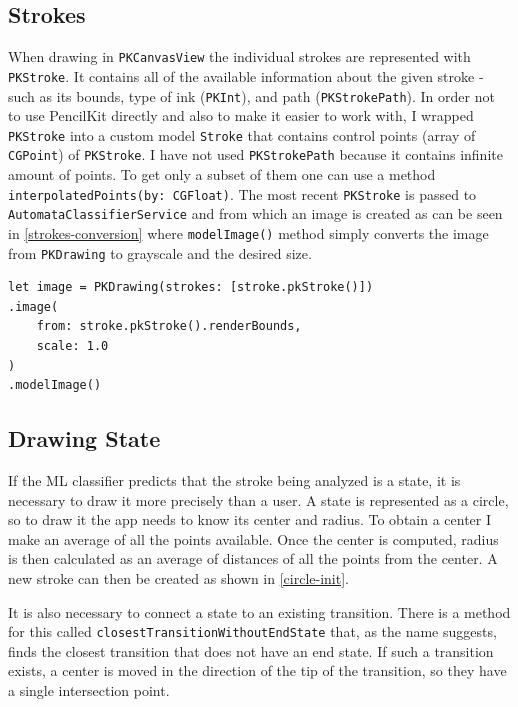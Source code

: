 \subsection{Strokes}

When drawing in \lstinline{PKCanvasView} the individual strokes are represented with \lstinline{PKStroke}. It contains all of the available information about the given stroke - such as its bounds, type of ink (\lstinline{PKInt}), and path (\lstinline{PKStrokePath}). In order not to use PencilKit directly and also to make it easier to work with, I wrapped \lstinline{PKStroke} into a custom model \lstinline{Stroke} that contains control points (array of \lstinline{CGPoint}) of \lstinline{PKStroke}. I have not used \lstinline{PKStrokePath} because it contains infinite amount of points. To get only a subset of them one can use a method \lstinline{interpolatedPoints(by: CGFloat)}. The most recent \lstinline{PKStroke} is passed to \lstinline{AutomataClassifierService} and from which an image is created as can be seen in \ref{strokes-conversion} where \lstinline{modelImage()} method simply converts the image from \lstinline{PKDrawing} to grayscale and the desired size.

\begin{lstlisting}[caption=Automata classifier, label=strokes-conversion]
let image = PKDrawing(strokes: [stroke.pkStroke()])
.image(
    from: stroke.pkStroke().renderBounds,
    scale: 1.0
)
.modelImage()
\end{lstlisting}

\subsection{Drawing State}

If the ML classifier predicts that the stroke being analyzed is a state, it is necessary to draw it more precisely than a user. A state is represented as a circle, so to draw it the app needs to know its center and radius. To obtain a center I make an average of all the points available. Once the center is computed, radius is then calculated as an average of distances of all the points from the center. A new stroke can then be created as shown in \ref{circle-init}.

It is also necessary to connect a state to an existing transition. There is a method for this called \lstinline{closestTransitionWithoutEndState} that, as the name suggests, finds the closest transition that does not have an end state. If such a transition exists, a center is moved in the direction of the tip of the transition, so they have a single intersection point.

